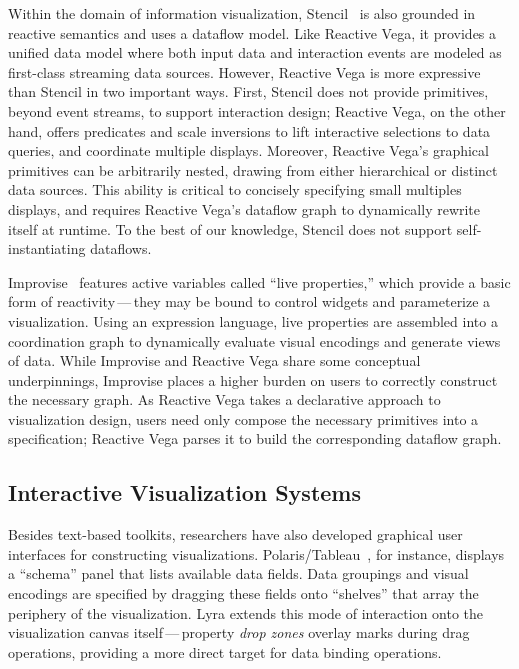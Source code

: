 Within the domain of information visualization, Stencil~\cite{cottam:stencil} is
also grounded in reactive semantics and uses a dataflow model. Like Reactive
Vega, it provides a unified data model where both input data and interaction
events are modeled as first-class streaming data sources. However, Reactive Vega
is more expressive than Stencil in two important ways. First, Stencil does not
provide primitives, beyond event streams, to support interaction design;
Reactive Vega, on the other hand, offers predicates and scale inversions to lift
interactive selections to data queries, and coordinate multiple displays.
Moreover, Reactive Vega's graphical primitives can be arbitrarily nested,
drawing from either hierarchical or distinct data sources. This ability is
critical to concisely specifying small multiples displays, and requires Reactive
Vega's dataflow graph to dynamically rewrite itself at runtime. To the best of
our knowledge, Stencil does not support self-instantiating dataflows.

Improvise~\cite{weaver:improvise} features active variables called ``live
properties,'' which provide a basic form of reactivity\,---\,they may be bound
to control widgets and parameterize a visualization. Using an expression
language, live properties are assembled into a coordination graph to dynamically
evaluate visual encodings and generate views of data. While Improvise and
Reactive Vega share some conceptual underpinnings, Improvise places a higher
burden on users to correctly construct the necessary graph. As Reactive Vega
takes a declarative approach to visualization design, users need only compose
the necessary primitives into a specification; Reactive Vega parses it to build
the corresponding dataflow graph.

\vspace{-10pt}

\subsection{Interactive Visualization Systems}

\vspace{-10pt}

Besides text-based toolkits, researchers have also developed graphical user
interfaces for constructing visualizations.
Polaris/Tableau~\cite{stolte:polaris}, for instance, displays a ``schema'' panel
that lists available data fields. Data groupings and visual encodings are
specified by dragging these fields onto ``shelves'' that array the periphery of
the visualization. Lyra extends this mode of interaction onto the visualization
canvas itself\,---\,property \emph{drop zones} overlay marks during drag
operations, providing a more direct target for data binding operations.

